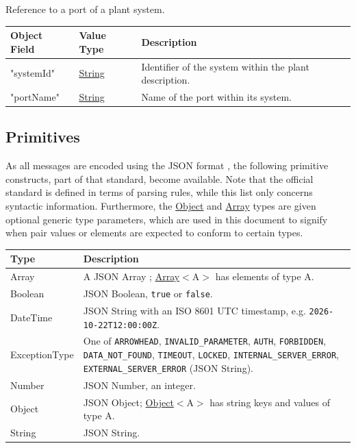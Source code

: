 \documentclass[a4paper]{arrowhead}
\newcommand{\pdef}[1]{{\textcolor{ArrowheadGrey}{#1 \label{sec:model:primitives:#1} \label{sec:model:primitives:#1s}}}}
\newcommand{\pref}[1]{{\textcolor{ArrowheadGrey}{\hyperref[sec:model:primitives:#1]{#1}}}}
\begin{document}

Reference to a port of a plant system.


\noindent\begin{tabularx}{\textwidth}{| >{\raggedright\arraybackslash}p{3.9cm} | >{\raggedright\arraybackslash\small}p{5.3cm} | X |} \hline
\rowcolor{gray!33} Object Field & Value Type & Description \\ \hline
"system\allowbreak{}Id" & \pref{String} & Identifier of the system within the plant description. \\ \hline
"port\allowbreak{}Name" & \pref{String} & Name of the port within its system. \\ \hline
\end{tabularx}



\subsection{Primitives}
\label{sec:model:primitives}

As all messages are encoded using the JSON format \cite{rfc8259}, the following primitive constructs, part of that standard, become available.
Note that the official standard is defined in terms of parsing rules, while this list only concerns syntactic information.
Furthermore, the \pref{Object} and \pref{Array} types are given optional generic type parameters, which are used in this document to signify when pair values or elements are expected to conform to certain types.

\noindent\begin{tabularx}{\textwidth}{| p{4.6cm} | X |} \hline
\rowcolor{gray!33} Type & Description \\ \hline
\pdef{Array} & A JSON Array \cite{rfc8259}; \pref{Array}$<$A$>$ has elements of type A. \\ \hline
\pdef{Boolean} & JSON Boolean, \texttt{true} or \texttt{false}. \\ \hline
\pdef{DateTime} & JSON String with an ISO 8601 UTC timestamp, e.g. \texttt{2026-10-22T12:00:00Z}. \\ \hline
\pdef{ExceptionType} & One of \texttt{ARROWHEAD}, \texttt{INVALID\_\allowbreak{}PARAMETER}, \texttt{AUTH}, \texttt{FORBIDDEN}, \texttt{DATA\_\allowbreak{}NOT\_\allowbreak{}FOUND}, \texttt{TIMEOUT}, \texttt{LOCKED}, \texttt{INTERNAL\_\allowbreak{}SERVER\_\allowbreak{}ERROR}, \texttt{EXTERNAL\_\allowbreak{}SERVER\_\allowbreak{}ERROR} (JSON String). \\ \hline
\pdef{Number} & JSON Number, an integer. \\ \hline
\pdef{Object} & JSON Object; \pref{Object}$<$A$>$ has string keys and values of type A. \\ \hline
\pdef{String} & JSON String. \\ \hline
\end{tabularx}
\end{document}
